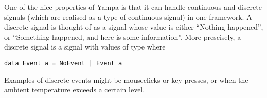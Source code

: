 One of the nice properties of Yampa is that it can handle continuous and discrete signals (which are realised as a type of continuous signal) in one framework. A discrete signal is thought of as a signal whose value is either ``Nothing happened'', or ``Something happened, and here is some information''. More prescisely, a discrete signal is a signal with values of type  where

\begin{lstlisting}
data Event a = NoEvent | Event a
\end{lstlisting}

Examples of discrete events might be mouseclicks or key presses, or when the ambient temperature exceeds a certain level.
